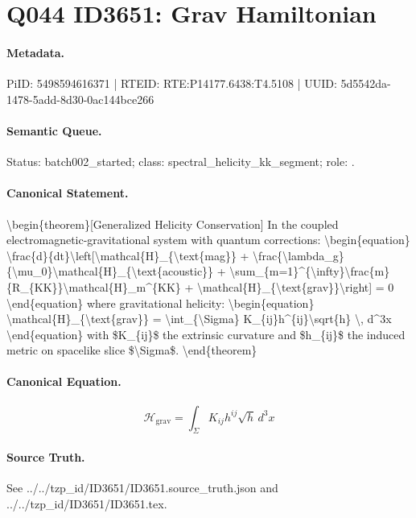 \section*{Q044 ID3651: Grav Hamiltonian}
\paragraph{Metadata.}
PiID: 5498594616371 | RTEID: RTE:P14177.6438:T4.5108 | UUID: 5d5542da-1478-5add-8d30-0ac144bce266

\paragraph{Semantic Queue.}
Status: batch002\_started; class: spectral\_helicity\_kk\_segment; role: .

\paragraph{Canonical Statement.}
\textbackslash{}begin\{theorem\}[Generalized Helicity Conservation] In the coupled electromagnetic-gravitational system with quantum corrections: \textbackslash{}begin\{equation\} \textbackslash{}frac\{d\}\{dt\}\textbackslash{}left[\textbackslash{}mathcal\{H\}\_\{\textbackslash{}text\{mag\}\} + \textbackslash{}frac\{\textbackslash{}lambda\_g\}\{\textbackslash{}mu\_0\}\textbackslash{}mathcal\{H\}\_\{\textbackslash{}text\{acoustic\}\} + \textbackslash{}sum\_\{m=1\}\textasciicircum{}\{\textbackslash{}infty\}\textbackslash{}frac\{m\}\{R\_\{KK\}\}\textbackslash{}mathcal\{H\}\_m\textasciicircum{}\{KK\} + \textbackslash{}mathcal\{H\}\_\{\textbackslash{}text\{grav\}\}\textbackslash{}right] = 0 \textbackslash{}end\{equation\} where gravitational helicity: \textbackslash{}begin\{equation\} \textbackslash{}mathcal\{H\}\_\{\textbackslash{}text\{grav\}\} = \textbackslash{}int\_\{\textbackslash{}Sigma\} K\_\{ij\}h\textasciicircum{}\{ij\}\textbackslash{}sqrt\{h\} \textbackslash{}, d\textasciicircum{}3x \textbackslash{}end\{equation\} with \$K\_\{ij\}\$ the extrinsic curvature and \$h\_\{ij\}\$ the induced metric on spacelike slice \$\textbackslash{}Sigma\$. \textbackslash{}end\{theorem\}

\paragraph{Canonical Equation.}
\[
\begin{equation} \mathcal{H}_{\text{grav}} = \int_{\Sigma} K_{ij}h^{ij}\sqrt{h} \, d^3x \end{equation}
\]

\paragraph{Source Truth.}
See ../../tzp\_id/ID3651/ID3651.source\_truth.json and ../../tzp\_id/ID3651/ID3651.tex.
